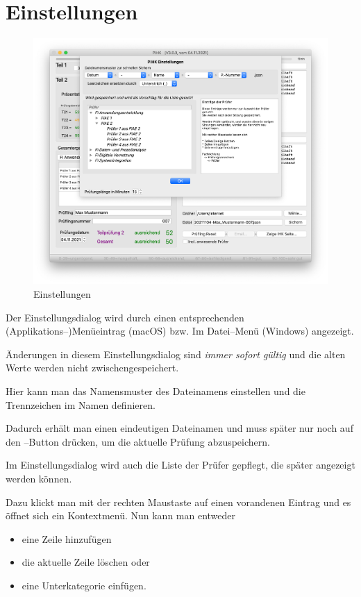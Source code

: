 \documentclass[a4paper,notitlepage,parskip=half]{scrartcl}
\begin{document}
\section{Einstellungen}

\begin{figure}[ht]
  \centering
  \includegraphics[width=\textwidth]{Einstellungen.png}
  \caption{Einstellungen}
  \label{fig:einstellungen}
\end{figure}

Der Einstellungsdialog wird durch einen entsprechenden (Applikations--)Menüeintrag (macOS) bzw. Im Datei--Menü (Windows) angezeigt.

Änderungen in diesem Einstellungsdialog sind \emph{immer sofort gültig} und die alten Werte werden nicht zwischengespeichert.

Hier kann man das Namensmuster des Dateinamens einstellen und die Trennzeichen im Namen definieren.

Dadurch erhält man einen eindeutigen Dateinamen und muss später nur noch auf den --Button drücken, um die aktuelle Prüfung abzuspeichern.

Im Einstellungsdialog wird auch die Liste der Prüfer gepflegt, die später angezeigt werden können.

Dazu klickt man mit der rechten Maustaste auf einen vorandenen Eintrag und es öffnet sich ein Kontextmenü.
Nun kann man entweder

\begin{itemize}
\item eine Zeile hinzufügen
\item die aktuelle Zeile löschen oder
\item eine Unterkategorie einfügen. 
\end{itemize}
\end{document}
